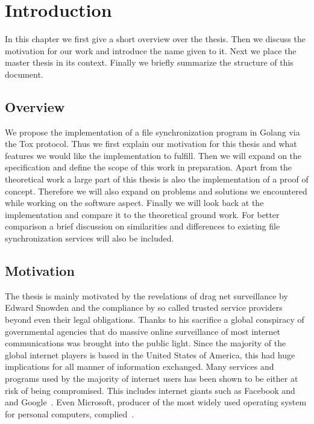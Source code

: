 \chapter{Introduction}
\label{chap:Introduction}

In this chapter we first give a short overview over the thesis.
Then we discuss the motivation for our work and introduce the name given to it.
Next we place the master thesis in its context.
Finally we briefly summarize the structure of this document.

\section{Overview}

We propose the implementation of a file synchronization program in Golang via the Tox protocol.
Thus we first explain our motivation for this thesis and what features we would like the implementation to fulfill.
Then we will expand on the specification and define the scope of this work in preparation.
Apart from the theoretical work a large part of this thesis is also the implementation of a proof of concept.
Therefore we will also expand on problems and solutions we encountered while working on the software aspect.
Finally we will look back at the implementation and compare it to the theoretical ground work.
For better comparison a brief discussion on similarities and differences to existing file synchronization services will also be included.

\section{Motivation}

The thesis is mainly motivated by the revelations of drag net surveillance by Edward Snowden and the compliance by so called trusted service providers beyond even their legal obligations.
Thanks to his sacrifice a global conspiracy of governmental agencies that do massive online surveillance of most internet communications was brought into the public light.
Since the majority of the global internet players is based in the United States of America, this had huge implications for all manner of information exchanged.
Many services and programs used by the majority of internet users has been shown to be either at risk of being compromised.
This includes internet giants such as Facebook and and Google~\cite{web:site:tg:internet_giants}.
Even Microsoft, producer of the most widely used operating system for personal computers, complied~\cite{web:site:tg:microsoft}.

